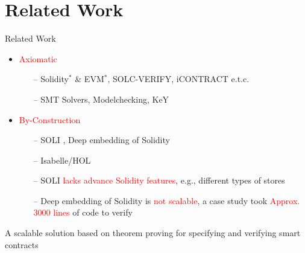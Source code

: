 \documentclass[aspectratio=169]{beamer}
\newcommand{\tikzmark}[2][]{%
  \tikz[remember picture,overlay,baseline=-.5ex] \node[#1] (#2) {};%
}
\begin{document}
\section{Related Work}
\begin{frame}{Related Work}
%
\begin{itemize}
%
\item{\textcolor{red}{Axiomatic}}
\begin{itemize}
\item[--] Solidity$^*$ \& EVM$^*$, SOLC-VERIFY, iCONTRACT e.t.c. 
\item[--] SMT Solvers, Modelchecking, KeY
\end{itemize}
%
%
\item{\textcolor{red}{By-Construction}}
\begin{itemize}
\item[--] SOLI , Deep embedding of Solidity 
\item[--] Isabelle/HOL
\item[--] SOLI \textcolor{red}{lacks advance Solidity features}, e.g., different types of stores
\item[--] Deep embedding of Solidity is \textcolor{red}{not scalable}, a case study took \textcolor{red}{Approx. 3000 lines} of code to verify

\end{itemize}
%

\end{itemize}
\vspace{0.5in}
\begin{exampleblock}{}
{\large \begin{center}A scalable solution based on theorem proving for specifying and verifying smart contracts \end{center}}
\end{exampleblock}
\end{frame}

\end{document}
